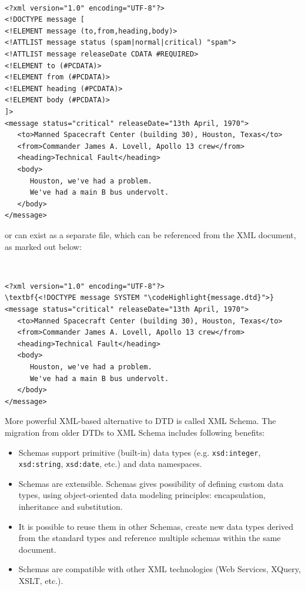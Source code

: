 \newpage

{\tt \small
\begin{verbatim}
<?xml version="1.0" encoding="UTF-8"?>
<!DOCTYPE message [
<!ELEMENT message (to,from,heading,body)>
<!ATTLIST message status (spam|normal|critical) "spam">
<!ATTLIST message releaseDate CDATA #REQUIRED>
<!ELEMENT to (#PCDATA)>
<!ELEMENT from (#PCDATA)>
<!ELEMENT heading (#PCDATA)>
<!ELEMENT body (#PCDATA)>
]>
<message status="critical" releaseDate="13th April, 1970">
   <to>Manned Spacecraft Center (building 30), Houston, Texas</to>
   <from>Commander James A. Lovell, Apollo 13 crew</from>
   <heading>Technical Fault</heading>
   <body>
      Houston, we've had a problem. 
      We've had a main B bus undervolt.
   </body>
</message>
\end{verbatim}
}

\noindent or can exist as a separate file, which can be referenced from the XML document, as marked out below:

{\tt \small
\newcommand\codeHighlight[1]{\textcolor[rgb]{1,0,0}{\textbf{#1}}}
\begin{Verbatim}[commandchars=\\\{\}]
<?xml version="1.0" encoding="UTF-8"?>
\textbf{<!DOCTYPE message SYSTEM "\codeHighlight{message.dtd}">}
<message status="critical" releaseDate="13th April, 1970">
   <to>Manned Spacecraft Center (building 30), Houston, Texas</to>
   <from>Commander James A. Lovell, Apollo 13 crew</from>
   <heading>Technical Fault</heading>
   <body>
      Houston, we've had a problem. 
      We've had a main B bus undervolt.
   </body>
</message>
\end{Verbatim}
}

\noindent More powerful XML-based alternative to DTD is called XML Schema. The migration from older DTDs to XML Schema includes following benefits:
\begin{itemize}
    \setlength{\itemsep}{0cm}
    \setlength{\parskip}{0cm}

    \item Schemas support primitive (built-in) data types (e.g. \texttt{xsd:integer}, \texttt{xsd:string}, \texttt{xsd:date}, etc.) and data namespaces.
    \item Schemas are extensible. Schemas gives possibility of defining custom data types, using object-oriented data modeling principles: encapsulation, inheritance and substitution.
    \item It is possible to reuse them in other Schemas, create new data types derived from the standard types and reference multiple schemas within the same document.
    \item Schemas are compatible with other XML technologies (Web Services, XQuery, XSLT, etc.).
\end{itemize}

